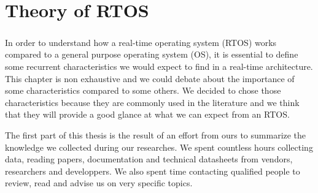 \chapter{Theory of RTOS\label{part:rtos-theory}}

\paragraph{}
In order to understand how a real-time operating system (RTOS) works compared to a general purpose operating system (OS),
    it is essential to define some recurrent characteristics we would expect to find in a real-time architecture.
\\
This chapter is non exhaustive and we could debate about the importance of some characteristics compared to some others.
We decided to chose those characteristics because they are commonly used in the literature
    and we think that they will provide a good glance at what we can expect from an RTOS.

The first part of this thesis is the result of an effort from ours to summarize the knowledge we collected during our researches.
We spent countless hours collecting data, reading papers, documentation and technical datasheets from vendors, researchers and developpers.
We also spent time contacting qualified people to review, read and advise us on very specific topics.










